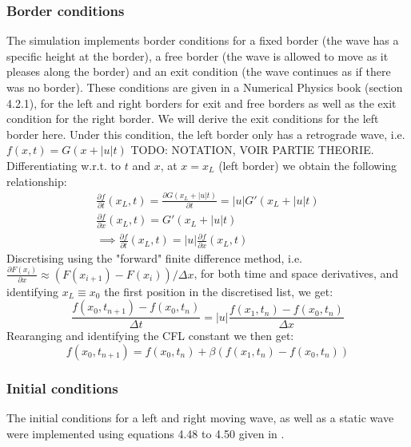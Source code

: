 \subsubsection{Border conditions}

The simulation implements border conditions for a fixed border (the wave has a specific height at the border), a free border (the wave is allowed to move as it pleases along the border) and an exit condition (the wave continues as if there was no border). These conditions are given in a Numerical Physics book \cite{physnumbook} (section 4.2.1), for the left and right borders for exit and free borders as well as the exit condition for the right border. We will derive the exit conditions for the left border here. Under this condition, the left border only has a retrograde wave, i.e. \(f(x, t) = G(x + |u| t)\) TODO: NOTATION, VOIR PARTIE THEORIE. Differentiating w.r.t. to \(t\) and \(x\), at \(x = x_L\) (left border) we obtain the following relationship:
\begin{gather}
    \frac{\partial f}{\partial t}(x_L, t) = \frac{\partial G(x_L + |u| t)}{\partial t} = |u| G'(x_L + |u| t) \\
    \frac{\partial f}{\partial x}(x_L, t) = G'(x_L + |u| t) \\
    \implies \frac{\partial f}{\partial t}(x_L, t) = |u| \frac{\partial f}{\partial x}(x_L, t)
\end{gather}
Discretising using the "forward" finite difference method, i.e. \(\frac{\partial F(x_i)}{\partial x} \approx (F(x_{i+1}) - F(x_i))/\Delta x\), for both time and space derivatives, and identifying \(x_L \equiv x_0\) the first position in the discretised list, we get:
\begin{equation}
    \frac{f(x_0,t_{n+1}) - f(x_0, t_n)}{\Delta t} = |u| \frac{f(x_1, t_n) - f(x_0, t_n)}{\Delta x}
\end{equation}
Rearanging and identifying the CFL constant we then get:
\begin{equation}
    f(x_0, t_{n+1}) = f(x_0, t_n) + \beta \left( f(x_1, t_n) - f(x_0, t_n) \right)
\end{equation}

\subsubsection{Initial conditions}

The initial conditions for a left and right moving wave, as well as a static wave were implemented using equations 4.48 to 4.50 given in \cite{physnumbook}.

